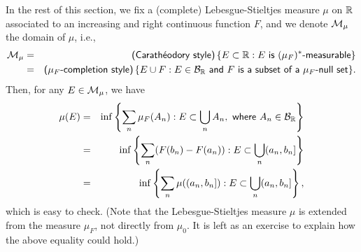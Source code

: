 In the rest of this section, we fix a (complete) Lebesgue-Stieltjes measure $\mu$ on ${\mathbb{R}}$ associated to an increasing and right continuous function $F$, and we denote ${\mathcal{M}}_\mu$ the domain of $\mu$, i.e., 
\begin{eqnarray*}
    {\mathcal{M}}_\mu
    &=&\textsf{(Carath\'eodory style)}\,\{
    E\subset{\mathbb{R}}
    :
    \textsf{$E$ is $(\mu_F)^*$-measurable}
    \}\\
    &=&\textsf{($\mu_F$-completion style)}\,\{
    E\cup F
    :
    \textsf{$E\in{\mathcal{B}}_{\mathbb{R}}$ and $F$ is a subset of a $\mu_F$-null set}
    \}.
\end{eqnarray*}
Then, for any $E\in{\mathcal{M}}_\mu$, we have
\begin{eqnarray*}
    \mu(E)
    &=&\inf\left\{
        \sum_n\mu_F(A_n)
        :
        E\subset\bigcup_n A_n,\textsf{ where }A_n\in{\mathcal{B}}_{\mathbb{R}}
        \right\}\\
    &=&\inf\left\{
        \sum_n(F(b_n)-F(a_n))
        :
        E\subset\bigcup_n(a_n, b_n]
        \right\}\\
    &=&\inf\left\{
        \sum_n\mu((a_n, b_n])
        :
        E\subset\bigcup_n(a_n, b_n]
        \right\},
\end{eqnarray*}
which is easy to check.
(Note that the Lebesgue-Stieltjes measure $\mu$ is extended from the measure $\mu_F$, not directly from $\mu_0$. \color{brown}It is left as an exercise to explain how the above equality could hold.\color{black})

